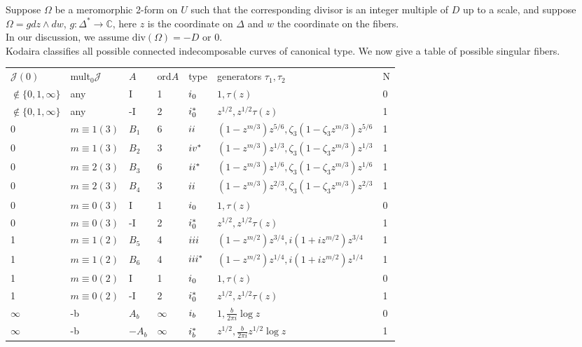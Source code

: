 Suppose $\Omega$ be a meromorphic 2-form on $U$ such that the corresponding divisor is an integer multiple of $D$ up to a scale, and suppose $\Omega=gdz\wedge dw$, $g\colon\Delta^*\rightarrow\mathbb{C}$, here $z$ is the coordinate on $\Delta$ and $w$ the coordinate on the fibers.\\ \indent
In our discussion, we assume $\textrm{div}(\Omega)=-D$ or 0.\\ \indent
Kodaira classifies\cite{kodaira1963compact} all possible connected indecomposable curves of canonical type. We now give a table of possible singular fibers.\\
\begin{table}[]
\begin{tabular}{lllllll}
$\mathscr{J}(0)$& mult$_0\mathscr{J}$ & $A$ & ord$A$ & type & generators $\tau_1,\tau_2$ & N \\
$\notin\{0,1,\infty\}$ & any & I & 1 & $\uppercase\expandafter{\romannumeral1}_0$ & $1,\tau(z)$ &  0\\
$\notin\{0,1,\infty\}$ & any & -I & 2 & $\uppercase\expandafter{\romannumeral1}_0^*$ & $z^{1/2},z^{1/2}\tau(z)$ &  1\\
0& $m\equiv1(3)$ & $B_1$ & 6 & $\uppercase\expandafter{\romannumeral2}$ & $(1-z^{m/3})z^{5/6},\zeta_3(1-\zeta_3z^{m/3})z^{5/6}$ & 1 \\
0& $m\equiv1(3)$ & $B_2$ & 3 & $\uppercase\expandafter{\romannumeral4}^*$ & $(1-z^{m/3})z^{1/3},\zeta_3(1-\zeta_3z^{m/3})z^{1/3}$ & 1 \\
0& $m\equiv2(3)$ & $B_3$ & 6 & $\uppercase\expandafter{\romannumeral2}^*$ & $(1-z^{m/3})z^{1/6},\zeta_3(1-\zeta_3z^{m/3})z^{1/6}$ & 1 \\
0& $m\equiv2(3)$ & $B_4$ & 3 & $\uppercase\expandafter{\romannumeral2}$ & $(1-z^{m/3})z^{2/3},\zeta_3(1-\zeta_3z^{m/3})z^{2/3}$ & 1 \\
0& $m\equiv0(3)$ & I & 1 & $\uppercase\expandafter{\romannumeral1}_0$ & $1,\tau(z)$ & 0 \\
0& $m\equiv0(3)$ & -I & 2 & $\uppercase\expandafter{\romannumeral1}_0^*$ & $z^{1/2},z^{1/2}\tau(z)$ & 1 \\
1& $m\equiv1(2)$ & $B_5$ & 4 & $\uppercase\expandafter{\romannumeral3}$ & $(1-z^{m/2})z^{3/4},i(1+iz^{m/2})z^{3/4}$ & 1 \\
1& $m\equiv1(2)$ & $B_6$ & 4 & $\uppercase\expandafter{\romannumeral3}^*$ & $(1-z^{m/2})z^{1/4},i(1+iz^{m/2})z^{1/4}$ & 1 \\
1& $m\equiv0(2)$ & I & 1 & $\uppercase\expandafter{\romannumeral1}_0$ & $1,\tau(z)$ & 0\\
1& $m\equiv0(2)$ & -I & 2 & $\uppercase\expandafter{\romannumeral1}_0^*$ & $z^{1/2},z^{1/2}\tau(z)$ & 1\\
$\infty$ & -b & $A_b$ & $\infty$ & $\uppercase\expandafter{\romannumeral1}_b$ & $1,\frac{b}{2\pi i}\log z$ & 0 \\
$\infty$ & -b & $-A_b$ & $\infty$ & $\uppercase\expandafter{\romannumeral1}_b^*$ & $z^{1/2},\frac{b}{2\pi i}z^{1/2}\log z$ & 1
\end{tabular}
\end{table}

